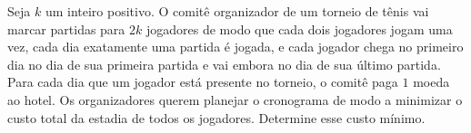 Seja $k$ um inteiro positivo.
O comitê organizador de um torneio de tênis vai marcar partidas para $2k$ jogadores de modo que cada dois jogadores jogam uma vez, cada dia exatamente uma partida é jogada, e cada jogador chega no primeiro dia no dia de sua primeira partida e vai embora no dia de sua último partida.
Para cada dia que um jogador está presente no torneio, o comitê paga $1$ moeda ao hotel.
Os organizadores querem planejar o cronograma de modo a minimizar o custo total da estadia de todos os jogadores. Determine esse custo mínimo.
